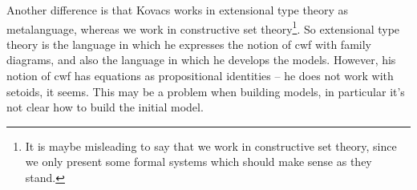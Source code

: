 \documentclass[11pt,a4paper]{article}
\begin{document}
Another difference is that Kovacs works in extensional type theory as metalanguage, whereas we work in constructive set theory\footnote{It is maybe misleading to say that we work in constructive set theory, since we only present some formal systems which should make sense as they stand.}. So extensional type theory is the language in which he expresses the notion of cwf with family diagrams, and also the language in which he develops the models. However, his notion of cwf has equations as propositional identities -- he does not work with setoids, it seems. This may be a problem when building models, in particular it's not clear how to build the initial model. 
\end{document}
